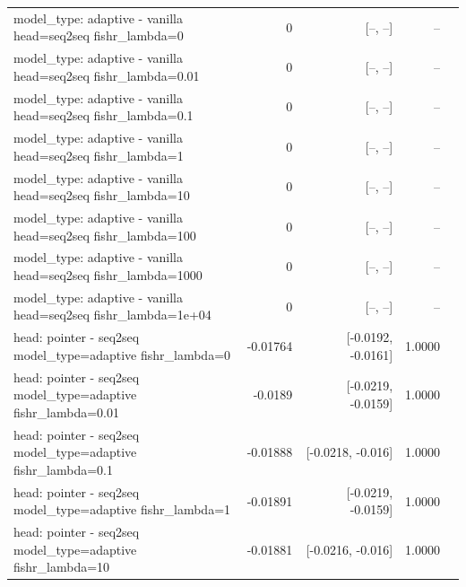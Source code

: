 \documentclass[10pt]{article}
\makeatletter
\newcommand{\stackcell}[1]{\begin{tabular}[t]{@{}l@{}}#1\end{tabular}}
\makeatother
\begin{document}
{\begin{longtable}{lrrrl}
\stackcell{model\_type: adaptive - vanilla\\\footnotesize head=seq2seq fishr\_lambda=0 } & 0 & [--, --] & -- & \\
\stackcell{model\_type: adaptive - vanilla\\\footnotesize head=seq2seq fishr\_lambda=0.01 } & 0 & [--, --] & -- & \\
\stackcell{model\_type: adaptive - vanilla\\\footnotesize head=seq2seq fishr\_lambda=0.1 } & 0 & [--, --] & -- & \\
\stackcell{model\_type: adaptive - vanilla\\\footnotesize head=seq2seq fishr\_lambda=1 } & 0 & [--, --] & -- & \\
\stackcell{model\_type: adaptive - vanilla\\\footnotesize head=seq2seq fishr\_lambda=10 } & 0 & [--, --] & -- & \\
\stackcell{model\_type: adaptive - vanilla\\\footnotesize head=seq2seq fishr\_lambda=100 } & 0 & [--, --] & -- & \\
\stackcell{model\_type: adaptive - vanilla\\\footnotesize head=seq2seq fishr\_lambda=1000 } & 0 & [--, --] & -- & \\
\stackcell{model\_type: adaptive - vanilla\\\footnotesize head=seq2seq fishr\_lambda=1e+04 } & 0 & [--, --] & -- & \\
\stackcell{head: pointer - seq2seq\\\footnotesize model\_type=adaptive fishr\_lambda=0 } & -0.01764 & [-0.0192, -0.0161] & 1.0000 & \\
\stackcell{head: pointer - seq2seq\\\footnotesize model\_type=adaptive fishr\_lambda=0.01 } & -0.0189 & [-0.0219, -0.0159] & 1.0000 & \\
\stackcell{head: pointer - seq2seq\\\footnotesize model\_type=adaptive fishr\_lambda=0.1 } & -0.01888 & [-0.0218, -0.016] & 1.0000 & \\
\stackcell{head: pointer - seq2seq\\\footnotesize model\_type=adaptive fishr\_lambda=1 } & -0.01891 & [-0.0219, -0.0159] & 1.0000 & \\
\stackcell{head: pointer - seq2seq\\\footnotesize model\_type=adaptive fishr\_lambda=10 } & -0.01881 & [-0.0216, -0.016] & 1.0000 & \\

\end{longtable}}
\end{document}
